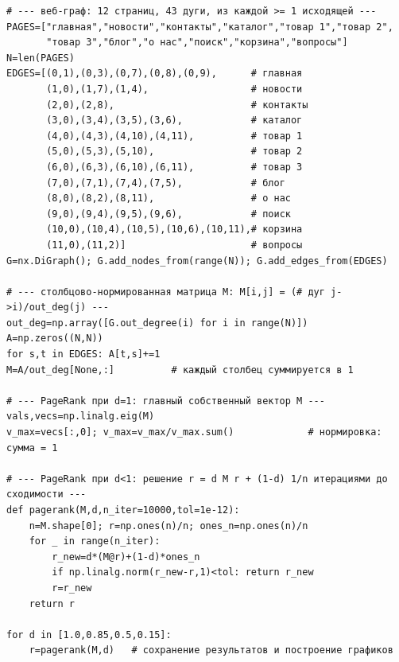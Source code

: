 \documentclass[12pt,a4paper]{article}
\begin{document}
\begin{verbatim}
# --- веб-граф: 12 страниц, 43 дуги, из каждой >= 1 исходящей ---
PAGES=["главная","новости","контакты","каталог","товар 1","товар 2",
       "товар 3","блог","о нас","поиск","корзина","вопросы"]
N=len(PAGES)
EDGES=[(0,1),(0,3),(0,7),(0,8),(0,9),      # главная
       (1,0),(1,7),(1,4),                  # новости
       (2,0),(2,8),                        # контакты
       (3,0),(3,4),(3,5),(3,6),            # каталог
       (4,0),(4,3),(4,10),(4,11),          # товар 1
       (5,0),(5,3),(5,10),                 # товар 2
       (6,0),(6,3),(6,10),(6,11),          # товар 3
       (7,0),(7,1),(7,4),(7,5),            # блог
       (8,0),(8,2),(8,11),                 # о нас
       (9,0),(9,4),(9,5),(9,6),            # поиск
       (10,0),(10,4),(10,5),(10,6),(10,11),# корзина
       (11,0),(11,2)]                      # вопросы
G=nx.DiGraph(); G.add_nodes_from(range(N)); G.add_edges_from(EDGES)

# --- столбцово-нормированная матрица M: M[i,j] = (# дуг j->i)/out_deg(j) ---
out_deg=np.array([G.out_degree(i) for i in range(N)])
A=np.zeros((N,N))
for s,t in EDGES: A[t,s]+=1
M=A/out_deg[None,:]          # каждый столбец суммируется в 1

# --- PageRank при d=1: главный собственный вектор M ---
vals,vecs=np.linalg.eig(M)
v_max=vecs[:,0]; v_max=v_max/v_max.sum()             # нормировка: сумма = 1

# --- PageRank при d<1: решение r = d M r + (1-d) 1/n итерациями до сходимости ---
def pagerank(M,d,n_iter=10000,tol=1e-12):
    n=M.shape[0]; r=np.ones(n)/n; ones_n=np.ones(n)/n
    for _ in range(n_iter):
        r_new=d*(M@r)+(1-d)*ones_n
        if np.linalg.norm(r_new-r,1)<tol: return r_new
        r=r_new
    return r

for d in [1.0,0.85,0.5,0.15]:
    r=pagerank(M,d)   # сохранение результатов и построение графиков
\end{verbatim}
\end{document}
